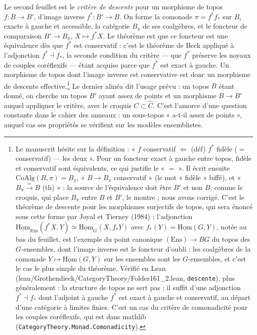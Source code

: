 \documentclass[11pt,a4paper]{article}
\begin{document}
Le second feuillet est le \emph{critère de descente} pour un morphisme de
topos $f : B \to B'$, d'image inverse $f^{*} : B' \to B$. On forme la
comonade $\pi = f^{*}f_{*}$ sur $B$, exacte à gauche et accessible, la
catégorie $B_{\pi}$ de ses coalgèbres, et le foncteur de comparaison $B'
\to B_{\pi}$, $X \mapsto f^{*}X$. Le théorème est que ce foncteur est une
équivalence dès que $f^{*}$ est conservatif : c'est le théorème de Beck
appliqué à l'adjonction $f^{*} \dashv f_{*}$, la seconde condition du
critère — que $f^{*}$ préserve les noyaux de couples coréflexifs — étant
acquise parce que $f^{*}$ est exact à gauche. Un morphisme de topos dont
l'image inverse est conservative est donc un morphisme de descente
effective.\footnote{Le manuscrit hésite sur la définition : « $f$
conservatif $\Leftarrow$ (déf) $f^{*}$ fidèle ($=$ conservatif) — les
deux ». Pour un foncteur exact à gauche entre topos, fidèle et conservatif
sont équivalents, ce qui justifie le « $=$ ». Il écrit ensuite $\mathrm{CoAlg}
(B, \pi) = B_{\pi}$, « $B \to B_{\pi}$ conservatif » (le mot « fidèle »
biffé), et « $B_{\pi} \xrightarrow{\simeq} B$ (th) » : la source de
l'équivalence doit être $B'$ et non $B$, comme le croquis, qui place
$B_{\pi}$ entre $B$ et $B'$, le montre ; nous avons corrigé. C'est le
théorème de descente pour les morphismes surjectifs de topos, qui sera
énoncé sous cette forme par Joyal et Tierney (1984) ; l'adjonction
$\underline{\mathrm{Hom}}_{\mathrm{Ens}}(f^{*}X, Y) \simeq
\underline{\mathrm{Hom}}_{G}(X, f_{*}Y)$ avec $f_{*}(Y) =
\underline{\mathrm{Hom}}(G, Y)$, notée au bas du feuillet, est l'exemple
du point canonique $(\mathrm{Ens}) \to BG$ du topos des $G$-ensembles,
dont l'image inverse est le foncteur d'oubli : les coalgèbres de la
comonade $Y \mapsto \underline{\mathrm{Hom}}(G, Y)$ sur les ensembles sont
les $G$-ensembles, et c'est le cas le plus simple du théorème. Vérifié en
Lean (lean/Grothendieck/CategoryTheory/Folder161\_2.lean, \texttt{descente}), plus
généralement : la structure de topos ne sert pas ; il suffit d'une adjonction
$f^{*} \dashv f_{*}$ dont l'adjoint à gauche $f^{*}$ est exact à gauche et
conservatif, au départ d'une catégorie à limites finies. C'est un cas du
critère de comonadicité pour les couples coréflexifs, qui est dans mathlib
(\texttt{CategoryTheory.Monad.Comonadicity}).} Le dernier alinéa dit l'usage prévu :
un topos $B$ étant donné, on cherche un topos $B'$ ayant assez de points
et un morphisme $B \to B'$ auquel appliquer le critère, avec le croquis
$C \subset \widehat{C}$. C'est l'amorce d'une question constante dans le
cahier des anneaux : un sous-topos « a-t-il assez de points », auquel cas
ses propriétés se vérifient sur les modèles ensemblistes.
\end{document}
